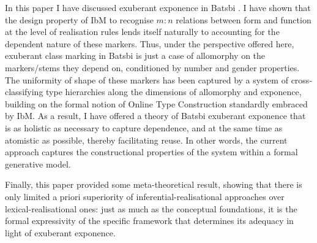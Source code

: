 \documentclass[output=paper]{langsci/langscibook}
\begin{document}
In this paper I have discussed exuberant exponence in Batsbi
\citep{Harris09}. I have shown that the design property of IbM to
recognise $m:n$ relations between form and function at the level of
realisation rules lends itself naturally to accounting for the dependent
nature of these markers. Thus, under the perspective offered here,
exuberant class marking in Batsbi is just a case of allomorphy on the
markers/stems they depend on, conditioned by number and gender
properties. The uniformity of shape of these markers has been captured
by a system of cross-classifying type hierarchies along the dimensions
of allomorphy and exponence, building on the formal notion of Online
Type Construction \citep{Koenig94} standardly embraced by IbM. As a
result, I have offered a theory of Batsbi exuberant exponence that is
as holistic as necessary to capture dependence, and at the same time as
atomistic as possible, thereby facilitating reuse. In other words, the
current approach captures the constructional properties of the system
within a formal generative model. 

  
  
  
  
  

Finally, this paper provided some meta-theoretical result, showing
that there is only limited a priori superiority of
inferential-realisational approaches over lexical-realisational ones:
just as much as the conceptual foundations, it is the formal
expressivity of the specific framework that determines its adequacy in
light of exuberant exponence.
\end{document}
